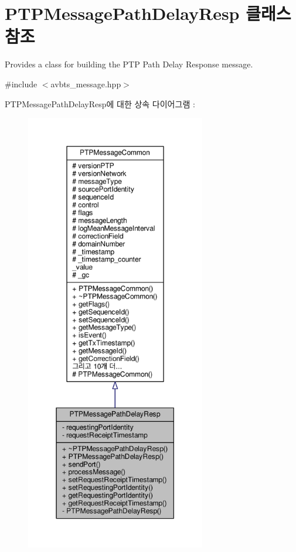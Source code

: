 \hypertarget{class_p_t_p_message_path_delay_resp}{}\section{P\+T\+P\+Message\+Path\+Delay\+Resp 클래스 참조}
\label{class_p_t_p_message_path_delay_resp}


Provides a class for building the P\+TP Path Delay Response message.  




{\ttfamily \#include $<$avbts\+\_\+message.\+hpp$>$}



P\+T\+P\+Message\+Path\+Delay\+Resp에 대한 상속 다이어그램 \+: 
\nopagebreak
\begin{figure}[H]
\begin{center}
\leavevmode
\includegraphics[height=550pt]{class_p_t_p_message_path_delay_resp__inherit__graph}
\end{center}
\end{figure}


